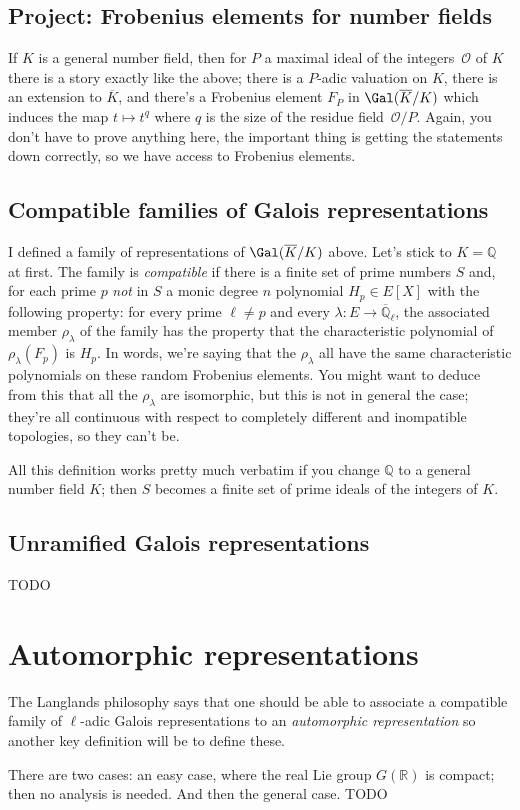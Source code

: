 \documentclass{amsart}
\newcommand{\Q}{\mathbb{Q}}
\newcommand{\R}{\mathbb{R}}
\begin{document}
\subsection{Project: Frobenius elements for number fields}

If $K$ is a general number field, then for $P$ a maximal ideal of the integers~$\mathcal{O}$ of $K$ there is a story exactly like the above; there is a $P$-adic valuation on $K$, there is an extension to $\overline{K}$, and there's a Frobenius element $F_P$ in $\Gal(\overline{K}/K)$ which induces the map $t\mapsto t^q$ where $q$ is the size of the residue field~$\mathcal{O}/P$. Again, you don't have to prove anything here, the important thing is getting the statements down correctly, so we have access to Frobenius elements.

\subsection{Compatible families of Galois representations}

I defined a family of representations of $\Gal(\overline{K}/K)$ above. Let's stick to $K=\Q$ at first. The family is \emph{compatible} if there is a finite set of prime numbers $S$ and, for each prime $p$ \emph{not} in $S$ a monic degree $n$ polynomial $H_p\in E[X]$ with the following property: for every prime $\ell\not=p$ and every $\lambda : E\to\overline{\Q}_\ell$, the associated member $\rho_\lambda$ of the family has the property that the characteristic polynomial of $\rho_{\lambda}(F_p)$ is $H_p$. In words, we're saying that the $\rho_\lambda$ all have the same characteristic polynomials on these random Frobenius elements. You might want to deduce from this that all the $\rho_\lambda$ are isomorphic, but this is not in general the case; they're all continuous with respect to completely different and inompatible topologies, so they can't be.

All this definition works pretty much verbatim if you change $\Q$ to a general number field $K$; then $S$ becomes a finite set of prime ideals of the integers of $K$.

\subsection{Unramified Galois representations}

TODO

\section{Automorphic representations}

The Langlands philosophy says that one should be able to associate a compatible family of $\ell$-adic Galois representations to an \emph{automorphic representation} so another key definition will be to define these.

There are two cases: an easy case, where the real Lie group $G(\R)$ is compact; then no analysis is needed. And then the general case. TODO
\end{document}
